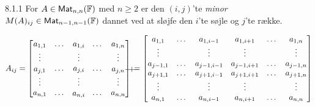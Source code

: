 \begin{definition}{8.1.1}
	For $A\in\textsf{Mat}_{n,n}(\mathbb{F})$ med $n \ge 2$ er den $(i,j)$'te
	\emph{minor} $M(A)_{ij} \in \textsf{Mat}_{n-1,n-1}(\mathbb{F})$ dannet ved at
	sløjfe den $i$'te søjle og $j$'te række.

	\[
		A_{ij} = \begin{bmatrix}
			a_{1,1} & \dotso & \tikz[remember picture,overlay] \node (t1)[anchor=base] {$a_{1,i}$}; & \dotso & a_{1,n}\\
			\vdots  &        & \vdots  &        & \vdots\\
			\tikz[remember picture, overlay] \node (t3){$a_{j,1}$}; & \dotso & a_{j,i} & \dotso & \tikz[remember picture, overlay] \node (t4) {$a_{j,n}$};\\
			\vdots  &        & \vdots  &        & \vdots\\
			a_{n,1} & \dotso & \tikz[remember picture,overlay] \node (t2) {$a_{n,i}$}; & \dotso & a_{n,n}
		\end{bmatrix}
		\begin{tikzpicture}[overlay,remember picture]
			\draw ([yshift=-1mm]t1.north) to ([yshift=2mm]t2.south);
			\draw ([yshift=.5mm, xshift=1mm]t3.west) to ([yshift=0.5mm, xshift=-1mm]t4.east);
		\end{tikzpicture}
		=
		\begin{bmatrix}
			a_{1,1} & \dotso & a_{1,i-1} & a_{1, i+1} & \dotso & a_{1,n}\\
			\vdots  &        & \vdots    & \vdots     &        & \vdots\\
			a_{j-1,1} & \dotso & a_{j-1,i-1} & a_{j-1, i+1} & \dotso & a_{j-1,n}\\
			a_{j+1,1} & \dotso & a_{j+1,i-1} & a_{j+1, i+1} & \dotso & a_{j+1,n}\\
			\vdots  &        & \vdots    & \vdots     &        & \vdots\\
			a_{n,1} & \dotso & a_{n,i-1} & a_{n, i+1} & \dotso & a_{n,n}
		\end{bmatrix}
	\]
\end{definition}
